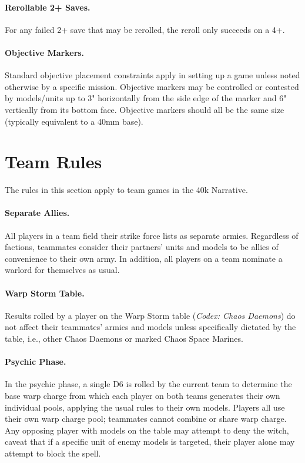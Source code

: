 \paragraph{Rerollable 2+ Saves.}
For any failed 2+ save that may be rerolled, the reroll only succeeds on a 4+.

\paragraph{Objective Markers.}
Standard objective placement constraints apply in setting up a game
unless noted otherwise by a specific mission.  Objective markers may
be controlled or contested by models/units up to 3" horizontally from
the side edge of the marker and 6" vertically from its bottom
face. Objective markers should all be the same size (typically
equivalent to a 40mm base).


\section{Team Rules}

The rules in this section apply to team games in the 40k Narrative.

\paragraph{Separate Allies.}
All players in a team field their strike force lists as separate
armies. Regardless of factions, teammates consider their
  partners' units and models to be allies of convenience to their own
  army.  In addition, all players on a team nominate a warlord for
themselves as usual.

\paragraph{Warp Storm Table.}
Results rolled by a player on the Warp Storm table (\emph{Codex: Chaos
  Daemons}) do not affect their teammates' armies and models unless
specifically dictated by the table, i.e., other Chaos Daemons or
marked Chaos Space Marines.

\paragraph{Psychic Phase.}
In the psychic phase, a single D6 is rolled by the current team to
determine the base warp charge from which each player on both teams
generates their own individual pools, applying the usual rules to
their own models. Players all use their own warp charge pool;
teammates cannot combine or share warp charge. Any opposing player
with models on the table may attempt to deny the witch, caveat that if
a specific unit of enemy models is targeted, their player alone may
attempt to block the spell.

